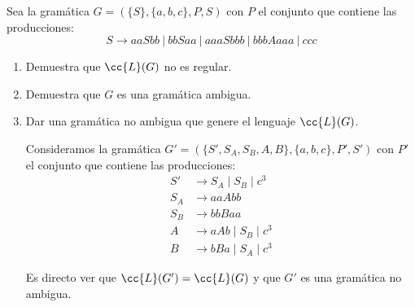\documentclass[12pt]{article}
\begin{document}
\begin{ejercicio}
    Sea la gramática $G=(\{S\},\{a,b,c\},P,S)$ con $P$ el conjunto que contiene las producciones:
    \begin{equation*}
        S \rightarrow aaSbb\ |\ bbSaa\ |\ aaaSbbb\ |\ bbbAaaa\ |\ ccc
    \end{equation*}
    \begin{enumerate}
        \item Demuestra que $\cc{L}(G)$ no es regular.
        
        \item Demuestra que $G$ es una gramática ambigua.
        
        \item Dar una gramática no ambigua que genere el lenguaje $\cc{L}(G)$.
        
        Consideramos la gramática $G'=(\{S', S_A, S_B, A, B\},\{a,b,c\},P',S')$ con $P'$ el conjunto que contiene las producciones:
        \begin{equation*}
            \begin{aligned}
                S' &\to S_A\mid S_B\mid c^3\\
                S_A &\to aaAbb\\
                S_B &\to bbBaa\\
                A &\to aAb \mid S_B\mid c^3\\
                B &\to bBa \mid S_A\mid c^3
            \end{aligned}
        \end{equation*}

        Es directo ver que $\cc{L}(G')=\cc{L}(G)$ y que $G'$ es una gramática no ambigua.
    \end{enumerate}
\end{ejercicio}
\end{document}
